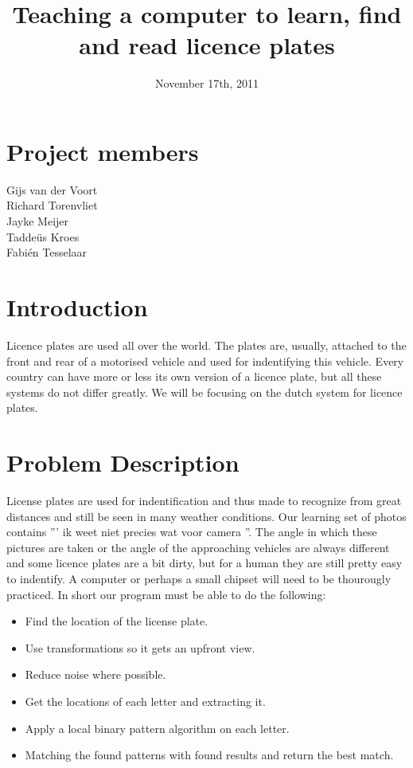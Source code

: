 \documentclass[a4paper]{article}
\title{Teaching a computer to learn, find and read licence plates}
\date{November 17th, 2011}
\begin{document}
\maketitle

\section*{Project members}
Gijs van der Voort\\Richard Torenvliet\\Jayke Meijer\\Tadde\"us Kroes\\Fabi\'en Tesselaar

\tableofcontents
\setcounter{secnumdepth}{1}

\section{Introduction}

Licence plates are used all over the world. The plates are, usually, attached to the front and rear
of a motorised vehicle and used for indentifying this vehicle. Every
country can have more or less its own version of a licence plate, but all these systems do not 
differ greatly. We will be focusing on the dutch system for licence plates.

\section{Problem Description}

License plates are used for indentification and thus made to recognize from great
distances and still be seen in many weather conditions. Our learning set of photos contains
''' ik weet niet precies wat voor camera ''. The angle in which these pictures are taken or the angle 
of the approaching vehicles are always different and some licence plates are a bit dirty,
but for a human they are still pretty easy to indentify. A computer or perhaps a small
chipset will need to be thourougly practiced. In short our program must be able to
do the following:

\begin{itemize}
\item Find the location of the license plate.
\item Use transformations so it gets an upfront view.
\item Reduce noise where possible.
\item Get the locations of each letter and extracting it.
\item Apply a local binary pattern algorithm on each letter.
\item Matching the found patterns with found results and return the best match.
\end{itemize}
\end{document}
